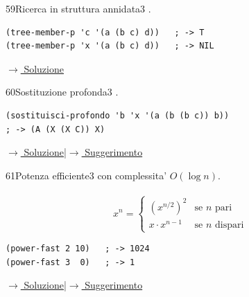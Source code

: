 \label{ex:59}
\begin{colbox}{59}{Ricerca in struttura annidata}{3}
 .
\nopagebreak
\begin{lstlisting}
(tree-member-p 'c '(a (b c) d))   ; -> T
(tree-member-p 'x '(a (b c) d))   ; -> NIL
\end{lstlisting}


\small\color{black!55}\hyperref[sol:59]{$\rightarrow$ Soluzione}\normalsize\color{black}
\end{colbox}

\label{ex:60}
\begin{stdbox}{60}{Sostituzione profonda}{3}
 .
\nopagebreak
\begin{lstlisting}
(sostituisci-profondo 'b 'x '(a (b (b c)) b))
; -> (A (X (X C)) X)
\end{lstlisting}


\small\color{black!55}\hyperref[sol:60]{$\rightarrow$ Soluzione}\enspace\textcolor{black!30}{|}\enspace\hyperref[hint:60]{$\rightarrow$ Suggerimento}\normalsize\color{black}
\end{stdbox}
\label{ex:61}
\begin{stdbox}{61}{Potenza efficiente}{3}
  con complessita' $O(\log n)$.\\\\
\[
x^n = \begin{cases}
  (x^{n/2})^2 & \text{se } n \text{ pari} \\
  x \cdot x^{n-1} & \text{se } n \text{ dispari}
\end{cases}
\]
\begin{lstlisting}
(power-fast 2 10)   ; -> 1024
(power-fast 3  0)   ; -> 1
\end{lstlisting}

\small\color{black!55}\hyperref[sol:61]{$\rightarrow$ Soluzione}\enspace\textcolor{black!30}{|}\enspace\hyperref[hint:61]{$\rightarrow$ Suggerimento}\normalsize\color{black}
\end{stdbox}
